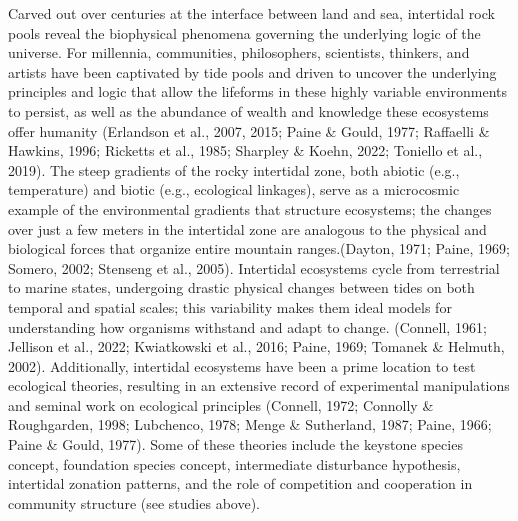 \documentclass{CSUNthesis}
\begin{document}
Carved out over centuries at the interface between land and sea, intertidal rock pools reveal the biophysical phenomena governing the underlying logic of the universe. For millennia, communities, philosophers, scientists, thinkers, and artists have been captivated by tide pools and driven to uncover the underlying principles and logic that allow the lifeforms in these highly variable environments to persist, as well as the abundance of wealth and knowledge these ecosystems offer humanity (Erlandson et al., 2007, 2015; Paine \& Gould, 1977; Raffaelli \& Hawkins, 1996; Ricketts et al., 1985; Sharpley \& Koehn, 2022; Toniello et al., 2019). The steep gradients of the rocky intertidal zone, both abiotic (e.g., temperature) and biotic (e.g., ecological linkages), serve as a microcosmic example of the environmental gradients that structure ecosystems; the changes over just a few meters in the intertidal zone are analogous to the physical and biological forces that organize entire mountain ranges.(Dayton, 1971; Paine, 1969; Somero, 2002; Stenseng et al., 2005). Intertidal ecosystems cycle from terrestrial to marine states, undergoing drastic physical changes between tides on both temporal and spatial scales; this variability makes them ideal models for understanding how organisms withstand and adapt to change. (Connell, 1961; Jellison et al., 2022; Kwiatkowski et al., 2016; Paine, 1969; Tomanek \& Helmuth, 2002). Additionally, intertidal ecosystems have been a prime location to test ecological theories, resulting in an extensive record of experimental manipulations and seminal work on ecological principles (Connell, 1972; Connolly \& Roughgarden, 1998; Lubchenco, 1978; Menge \& Sutherland, 1987; Paine, 1966; Paine \& Gould, 1977). Some of these theories include the keystone species concept, foundation species concept, intermediate disturbance hypothesis, intertidal zonation patterns, and the role of competition and cooperation in community structure (see studies above).
\end{document}

